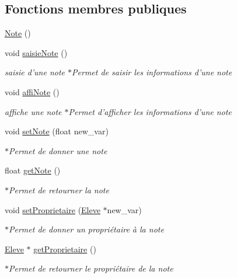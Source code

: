 \subsection*{Fonctions membres publiques}
\begin{DoxyCompactItemize}
\item 
\hyperlink{class_note_a11dfaf68eb7a094b121add4adb18620e}{Note} ()
\item 
void \hyperlink{class_note_a50a10d0644153ef3be5f66c6b53634c2}{saisie\-Note} ()
\begin{DoxyCompactList}\small\item\em saisie d'une note $\ast$\-Permet de saisir les informations d'une note \end{DoxyCompactList}\item 
void \hyperlink{class_note_ac1f76f3565bdbc29c607dfbd8196d27e}{affi\-Note} ()
\begin{DoxyCompactList}\small\item\em affiche une note $\ast$\-Permet d'afficher les informations d'une note \end{DoxyCompactList}\item 
void \hyperlink{class_note_afc30ddbaca8f8ef44a2ccda7ffdd22d9}{set\-Note} (float new\-\_\-var)
\begin{DoxyCompactList}\small\item\em $\ast$\-Permet de donner une note \end{DoxyCompactList}\item 
float \hyperlink{class_note_a2360b36c3e33284e9d9d19331659c631}{get\-Note} ()
\begin{DoxyCompactList}\small\item\em $\ast$\-Permet de retourner la note \end{DoxyCompactList}\item 
void \hyperlink{class_note_aaae9bd761fbbdccfc70052f2d157afa4}{set\-Proprietaire} (\hyperlink{class_eleve}{Eleve} $\ast$new\-\_\-var)
\begin{DoxyCompactList}\small\item\em $\ast$\-Permet de donner un propriétaire à la note \end{DoxyCompactList}\item 
\hyperlink{class_eleve}{Eleve} $\ast$ \hyperlink{class_note_a986afc3571fe0035f727e8b90abda6e1}{get\-Proprietaire} ()
\begin{DoxyCompactList}\small\item\em $\ast$\-Permet de retourner le propriétaire de la note \end{DoxyCompactList}\end{DoxyCompactItemize}


